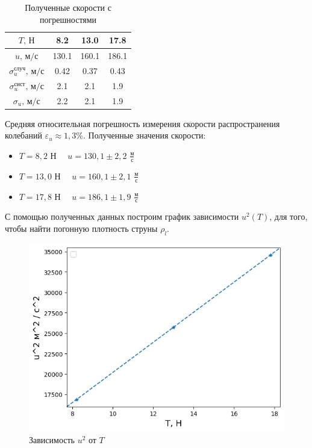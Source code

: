\documentclass[
a4paper, %
12pt, %
]{article}
\begin{document}
	\begin{table}[h]
		\begin{center}
			\begin{tabular}{|c|c|c|c|}
				\hline
				$T\text{, Н}$ & 8.2 & 13.0 & 17.8\\ \hline
				$u\text{, м/с}$  & 130.1 & 160.1 & 186.1 \\ \hline
				$\sigma_{u}^{\text{случ}} \text{, м/с}$ & 0.42 & 0.37 & 0.43  \\ \hline
				$\sigma_{u}^{\text{сист}} \text{, м/с}$ & 2.1 & 2.1 & 1.9 \\ \hline
				$\sigma_{u} \text{, м/с}$ & 2.2 & 2.1 & 1.9 \\ \hline
			\end{tabular}
			\caption{Полученные скорости с погрешностями}
		\end{center}
	\end{table}
	
	\noindent
	Средняя относительная погрешность измерения скорости распространения колебаний $\varepsilon_u \approx 1,3\% $. Полученные значения скорости:
	
	\begin{itemize}
		\item $T = 8,2$ Н  $\quad u = 130,1 \pm 2,2$ $\frac{\text{м}}{\text{с}}$
		\item  $T = 13,0$ Н  $\quad u = 160,1 \pm 2,1$ $\frac{\text{м}}{\text{с}}$
		\item  $T = 17,8$ Н  $\quad u = 186,1 \pm 1,9$ $\frac{\text{м}}{\text{с}}$
	\end{itemize}
	
	С помощью полученных данных построим график зависимости $u^2(T)$, для того, чтобы найти погонную плотность струны $ \rho_l $.
	
	\begin{figure}[h!]
		\begin{center}
			\includegraphics[scale=0.68]{graph_u_T.png}
			\caption{Зависимость $ u^2 $ от $ T $}
			\label{graph_u_T}
		\end{center}
	\end{figure}
	
\end{document}
